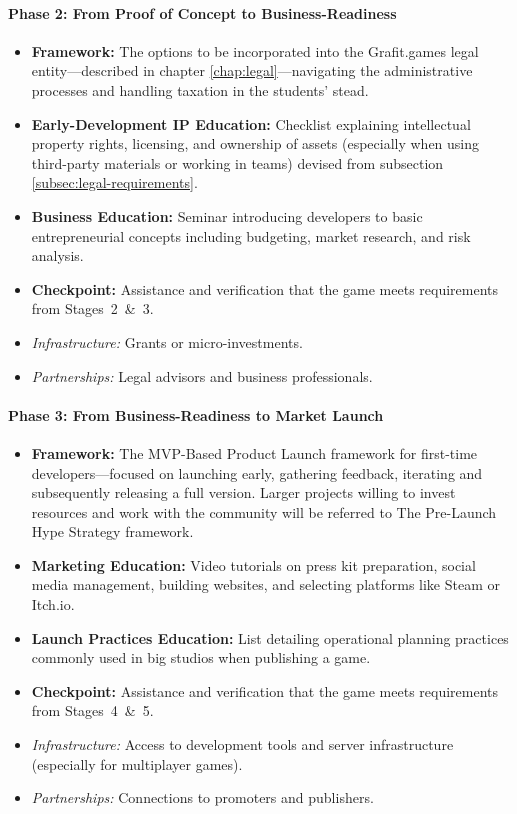 \paragraph{\large Phase 2: From Proof of Concept to Business-Readiness}
\begin{itemize}
    \item \textbf{Framework:} The options to be incorporated into the Grafit.games legal entity---described in chapter \ref{chap:legal}---navigating the administrative processes and handling taxation in the students’ stead.
    \item \textbf{Early-Development IP Education:} Checklist explaining intellectual property rights, licensing, and ownership of assets (especially when using third-party materials or working in teams) devised from subsection \ref{subsec:legal-requirements}.
    \item \textbf{Business Education:} Seminar introducing developers to basic entrepreneurial concepts including budgeting, market research, and risk analysis.
    \item \textbf{Checkpoint:} Assistance and verification that the game meets requirements from Stages~2~\&~3.
    \item \textit{Infrastructure:} Grants or micro-investments.
    \item \textit{Partnerships:} Legal advisors and business professionals.
\end{itemize}
\paragraph{\large Phase 3: From Business-Readiness to Market Launch}
\begin{itemize}
    \item \textbf{Framework:} The MVP-Based Product Launch framework for first-time developers---focused on launching early, gathering feedback, iterating and subsequently releasing a full version. Larger projects willing to invest resources and work with the community will be referred to The Pre-Launch Hype Strategy framework.
    \item \textbf{Marketing Education:} Video tutorials on press kit preparation, social media management, building websites, and selecting platforms like Steam or Itch.io.
    \item \textbf{Launch Practices Education:} List detailing operational planning practices commonly used in big studios when publishing a game.
    \item \textbf{Checkpoint:} Assistance and verification that the game meets requirements from Stages~4~\&~5.
    \item \textit{Infrastructure:} Access to development tools and server infrastructure (especially for multiplayer games).
    \item \textit{Partnerships:} Connections to promoters and publishers.
\end{itemize}
